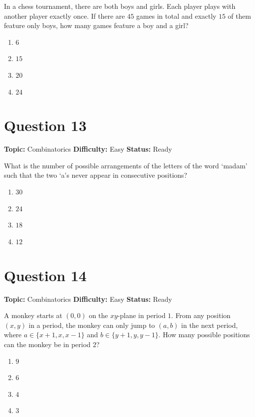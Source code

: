 \documentclass[11pt]{article}
\begin{document}
In a chess tournament, there are both boys and girls. Each player plays with another player exactly once. If there are $45$ games in total and exactly $15$ of them feature only boys, how many games feature a boy and a girl?
\begin{enumerate}[label=(\Alph*)]
\item $6$
\item $15$
\item $20$
\item $24$
\end{enumerate}

\newpage

\section*{Question 13}


\noindent\textbf{Topic:} Combinatorics \quad \textbf{Difficulty:} Easy \quad \textbf{Status:} Ready



What is the number of possible arrangements of the letters of the word `madam' such that the two `a's never appear in consecutive positions?
\begin{enumerate}[label=(\Alph*)]
\item $30$
\item $24$
\item $18$
\item $12$
\end{enumerate}

\newpage

\section*{Question 14}


\noindent\textbf{Topic:} Combinatorics \quad \textbf{Difficulty:} Easy \quad \textbf{Status:} Ready



A monkey starts at $(0,0)$ on the $xy$-plane in period $1$. From any position $(x,y)$ in a period, the monkey can only jump to $(a,b)$ in the next period, where $a\in\{x+1,x,x-1\}$ and $b\in\{y+1,y,y-1\}$. How many possible positions can the monkey be in period $2$?
\begin{enumerate}[label=(\Alph*)]
\item $9$
\item $6$
\item $4$
\item $3$
\end{enumerate}
\end{document}
